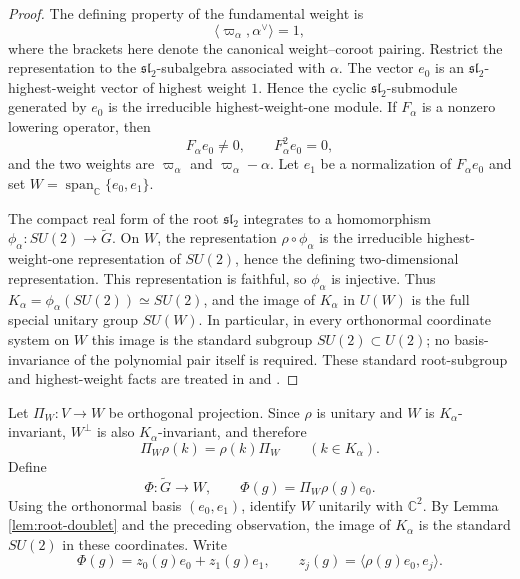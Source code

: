 \documentclass[11pt]{article}
\numberwithin{equation}{section}
\newcommand{\C}{\mathbb C}
\newcommand{\Span}{\operatorname{span}}
\newcommand{\ip}[2]{\langle #1,#2\rangle}
\begin{document}
\begin{proof}
The defining property of the fundamental weight is
\[
 \ip{\varpi_\alpha}{\alpha^\vee}=1,
\]
where the brackets here denote the canonical weight--coroot pairing.
Restrict the representation to the $\mathfrak{sl}_2$-subalgebra associated
with $\alpha$.  The vector $e_0$ is an $\mathfrak{sl}_2$-highest-weight vector
of highest weight $1$.  Hence the cyclic $\mathfrak{sl}_2$-submodule generated
by $e_0$ is the irreducible highest-weight-one module.  If $F_\alpha$ is a
nonzero lowering operator, then
\[
 F_\alpha e_0\neq0,
 \qquad
 F_\alpha^2e_0=0,
\]
and the two weights are $\varpi_\alpha$ and
$\varpi_\alpha-\alpha$.  Let $e_1$ be a normalization of $F_\alpha e_0$ and
set $W=\Span_\C\{e_0,e_1\}$.

The compact real form of the root $\mathfrak{sl}_2$ integrates to a
homomorphism $\phi_\alpha:SU(2)\to\widetilde G$.  On $W$, the
representation $\rho\circ\phi_\alpha$ is the irreducible
highest-weight-one representation of $SU(2)$, hence the defining
two-dimensional representation.  This representation is faithful, so
$\phi_\alpha$ is injective.  Thus
$K_\alpha=\phi_\alpha(SU(2))\simeq SU(2)$, and the image of $K_\alpha$ in
$U(W)$ is the full special unitary group $SU(W)$.  In particular, in every
orthonormal coordinate system on $W$ this image is the standard subgroup
$SU(2)\subset U(2)$; no basis-invariance of the polynomial pair itself is
required.  These standard
root-subgroup and highest-weight facts are treated in
\cite[Chapters V--VI]{BrockerTomDieck1985} and
\cite[Parts II--III]{Hall2015}.
\end{proof}

Let $\Pi_W:V\to W$ be orthogonal projection.  Since $\rho$ is unitary and
$W$ is $K_\alpha$-invariant, $W^\perp$ is also $K_\alpha$-invariant, and
therefore
\begin{equation}\label{eq:projection-commutes}
 \Pi_W\rho(k)=\rho(k)\Pi_W
 \qquad(k\in K_\alpha).
\end{equation}
Define
\begin{equation}\label{eq:Phi-definition}
 \Phi:\widetilde G\longrightarrow W,
 \qquad
 \Phi(g)=\Pi_W\rho(g)e_0.
\end{equation}
Using the orthonormal basis $(e_0,e_1)$, identify $W$ unitarily with
$\C^2$.  By Lemma \ref{lem:root-doublet} and the preceding observation, the
image of $K_\alpha$ is the standard $SU(2)$ in these coordinates.  Write
\begin{equation}\label{eq:z-coordinates}
 \Phi(g)=z_0(g)e_0+z_1(g)e_1,
 \qquad
 z_j(g)=\ip{\rho(g)e_0}{e_j}.
\end{equation}
\end{document}
